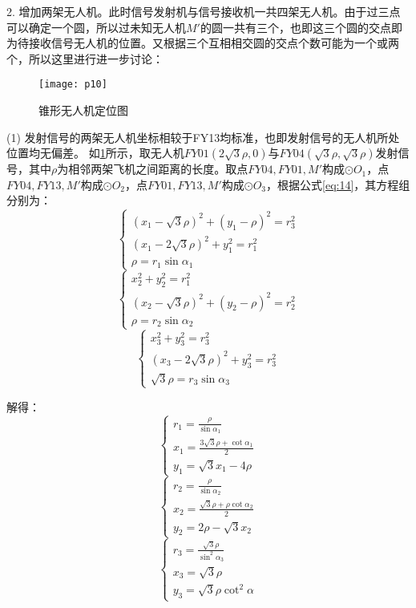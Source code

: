 \documentclass{cumcmthesis}
\begin{document}
2. 增加两架无人机。此时信号发射机与信号接收机一共四架无人机。由于过三点可以确定一个圆，所以过未知无人机$M'$的圆一共有三个，也即这三个圆的交点即为待接收信号无人机的位置。又根据三个互相相交圆的交点个数可能为一个或两个，所以这里进行进一步讨论：
\begin{figure}[H]
	\centering
	\texttt{[image: p10]}
	\caption{锥形无人机定位图}
	\label{fig:p10}
\end{figure}
(1) 发射信号的两架无人机坐标相较于FY13均标准，也即发射信号的无人机所处位置均无偏差。
如\cref{fig:p10}所示，取无人机$FY01(2\sqrt{3} \rho,0)$与$FY04(\sqrt{3} \rho,\sqrt{3} \rho)$发射信号，其中$\rho$为相邻两架飞机之间距离的长度。取点$FY04,FY01,M'$构成$\odot O_1$，点$FY04,FY13,M'$构成$\odot O_2$，点$FY01,FY13,M'$构成$\odot O_3$，根据公式\cref{eq:14}，其方程组分别为：
\[
\begin{cases}
	(x_1-\sqrt{3}\rho)^2+(y_1-\rho)^2=r_3^2\\
	(x_1-2\sqrt{3}\rho)^2+y_1^2=r_1^2\\
	\rho=r_1\sin \alpha_1
\end{cases}
\]
\[
\begin{cases}
	x_2^2+y_2^2=r_1^2\\
	(x_2-\sqrt{3}\rho)^2+(y_2-\rho)^2=r_2^2\\
	\rho=r_2\sin \alpha_2
\end{cases}
\]
\[
\begin{cases}
x_3^2+y_3^2=r_3^2\\
(x_3-2\sqrt{3}\rho)^2+y_3^2=r_3^2\\
\sqrt{3}\rho=r_3\sin \alpha_3
\end{cases}
\]

解得：
\begin{equation}
	\begin{cases}
		r_1=\frac{\rho}{\sin \alpha_1}\\
		x_1=\frac{3\sqrt{3} \rho +  \cot \alpha_1}{2}\\
		y_1=\sqrt{3}x_1-4\rho
	\end{cases}
	\label{eq:28}
\end{equation}
\begin{equation}
	\begin{cases}
		r_2=\frac{\rho}{\sin \alpha_2}\\
		x_2=\frac{\sqrt{3} \rho + \rho \cot \alpha_2}{2}\\
		y_2=2\rho-\sqrt{3}x_2
	\end{cases}
	\label{eq:29}
\end{equation}
\begin{equation}
	\begin{cases}
		r_3=\frac{\sqrt{3}\rho}{\sin^2 \alpha_3}\\
		x_3=\sqrt{3} \rho \\
		y_3=\sqrt{3} \rho \cot^2 \alpha
	\end{cases}
	\label{eq:30}
\end{equation}
\end{document}

